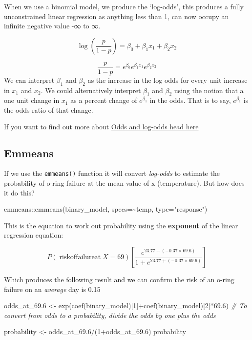 \documentclass[
]{book}
\newenvironment{Shaded}{\begin{snugshade}}{\end{snugshade}}
\newcommand{\AttributeTok}[1]{\textcolor[rgb]{0.77,0.63,0.00}{#1}}
\newcommand{\CommentTok}[1]{\textcolor[rgb]{0.56,0.35,0.01}{\textit{#1}}}
\newcommand{\DecValTok}[1]{\textcolor[rgb]{0.00,0.00,0.81}{#1}}
\newcommand{\FloatTok}[1]{\textcolor[rgb]{0.00,0.00,0.81}{#1}}
\newcommand{\FunctionTok}[1]{\textcolor[rgb]{0.00,0.00,0.00}{#1}}
\newcommand{\NormalTok}[1]{#1}
\newcommand{\OtherTok}[1]{\textcolor[rgb]{0.56,0.35,0.01}{#1}}
\newcommand{\SpecialCharTok}[1]{\textcolor[rgb]{0.00,0.00,0.00}{#1}}
\newcommand{\StringTok}[1]{\textcolor[rgb]{0.31,0.60,0.02}{#1}}
\begin{document}
When we use a binomial model, we produce the `log-odds', this produces a fully unconstrained linear regression as anything less than 1, can now occupy an infinite negative value -∞ to ∞.

\[\log\left(\frac{p}{1-p}\right)    =   \beta_{0}+\beta_{1}x_{1}+\beta_{2}x_{2}
\]

\[\frac{p}{1-p} =   e^{\beta_{0}}e^{\beta_{1}x_{1}}e^{\beta_{2}x_{2}}
\]
We can interpret \(\beta_{1}\) and \(\beta_{2}\) as the increase in the log odds for every unit increase in \(x_{1}\) and \(x_{2}\). We could alternatively interpret \(\beta_{1}\) and \(\beta_{2}\) using the notion that a one unit change in \(x_{1}\) as a percent change of \(e^{\beta_{1}}\) in the odds. That is to say, \(e^{\beta_{1}}\) is the odds ratio of that change.

If you want to find out more about \href{https://www.youtube.com/watch?v=8nm0G-1uJzA}{Odds and log-odds head here}

\hypertarget{emmeans}{%
\subsection{Emmeans}\label{emmeans}}

If we use the \texttt{emmeans()} function it will convert \emph{log-odds} to estimate the probability of o-ring failure at the mean value of x (temperature).
But how does it do this?

\begin{Shaded}
\begin{Highlighting}[]
\NormalTok{emmeans}\SpecialCharTok{::}\FunctionTok{emmeans}\NormalTok{(binary\_model, }\AttributeTok{specs=}\SpecialCharTok{\textasciitilde{}}\NormalTok{temp, }\AttributeTok{type=}\StringTok{"response"}\NormalTok{)}
\end{Highlighting}
\end{Shaded}

This is the equation to work out probability using the \textbf{exponent} of the linear regression equation:

\[
P(\operatorname{risk of failure at }  X=69)\left[ \frac{e^{23.77+(-0.37 \times 69.6)}}{1+e^{23.77+(-0.37 \times 69.6)}} \right]
\]

Which produces the following result and we can confirm the risk of an o-ring failure on an \emph{average} day is 0.15

\begin{Shaded}
\begin{Highlighting}[]
\NormalTok{odds\_at\_69}\FloatTok{.6} \OtherTok{\textless{}{-}} \FunctionTok{exp}\NormalTok{(}\FunctionTok{coef}\NormalTok{(binary\_model)[}\DecValTok{1}\NormalTok{]}\SpecialCharTok{+}\FunctionTok{coef}\NormalTok{(binary\_model)[}\DecValTok{2}\NormalTok{]}\SpecialCharTok{*}\FloatTok{69.6}\NormalTok{)}
\CommentTok{\# To convert from odds to a probability, divide the odds by one plus the odds}

\NormalTok{probability }\OtherTok{\textless{}{-}}\NormalTok{  odds\_at\_69}\FloatTok{.6}\SpecialCharTok{/}\NormalTok{(}\DecValTok{1}\SpecialCharTok{+}\NormalTok{odds\_at\_69}\FloatTok{.6}\NormalTok{)}
\NormalTok{probability}
\end{Highlighting}
\end{Shaded}
\end{document}
